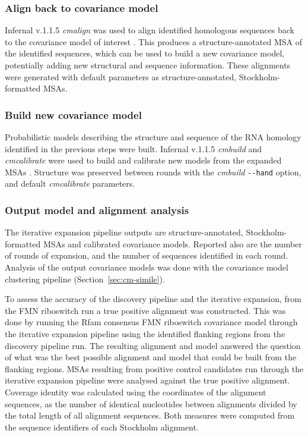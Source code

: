 \subsubsection{Align back to covariance model}

Infernal v.1.1.5 \emph{cmalign} was used to align identified homologous sequences back to the covariance model of interest \citep{Nawrocki2013}.
This produces a structure-annotated \ac{MSA} of the identified sequences, which can be used to build a new covariance model, potentially adding new structural and sequence information.
These alignments were generated with default parameters as structure-annotated, Stockholm-formatted \acp{MSA}.

\subsubsection{Build new covariance model}

Probabilistic models describing the structure and sequence of the RNA homology identified in the previous steps were built.
Infernal v.1.1.5 \emph{cmbuild} and \emph{cmcalibrate} were used to build and calibrate new models from the expanded \acp{MSA} \citep{Nawrocki2013}.
Structure was preserved between rounds with the \emph{cmbuild} \texttt{-{}-hand} option, and default \emph{cmcalibrate} parameters.

\subsubsection{Output model and alignment analysis}

The iterative expansion pipeline outputs are structure-annotated, Stockholm-formatted \acp{MSA} and calibrated covariance models.
Reported also are the number of rounds of expansion, and the number of sequences identified in each round.
Analysis of the output covariance models was done with the covariance model clustering pipeline (Section~\ref{sec:cm-simile}).

To assess the accuracy of the discovery pipeline and the iterative expansion, from the \ac{FMN} riboswitch run a true positive alignment was constructed.
This was done by running the Rfam consensus \ac{FMN} riboswitch covariance model through the iterative expansion pipeline using the identified flanking regions from the discovery pipeline run.
The resulting alignment and model answered the question of what was the best possible alignment and model that could be built from the flanking regions.
\ac{MSA}s resulting from positive control candidates run through the iterative expansion pipeline were analysed against the true positive alignment.
Coverage identity was calculated using the coordinates of the alignment sequences, as the number of identical nucleotides between alignments divided by the total length of all alignment sequences.
Both measures were computed from the sequence identifiers of each Stockholm alignment.

